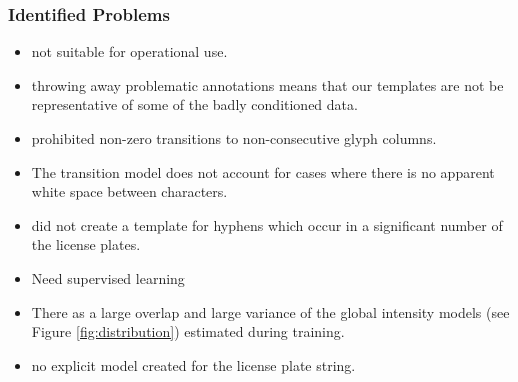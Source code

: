 \documentclass{beamer}
\begin{document}
\begin{frame}
  \frametitle{Identified Problems}
\begin{itemize}
\item not suitable for operational use.
\item throwing away problematic annotations means that our templates
  are not be representative of some of the badly conditioned data.
\item prohibited non-zero transitions to non-consecutive glyph
  columns.
\item The transition model does not account for cases where there is
  no apparent white space between characters.
\item did not create a template for hyphens which occur in a
  significant number of the license plates.
\item Need supervised learning
\item There as a large overlap and large variance of the global
  intensity models (see Figure \ref{fig:distribution}) estimated
  during training.
\item no explicit model created for the license plate string.
\end{itemize}
\end{frame}
\end{document}
